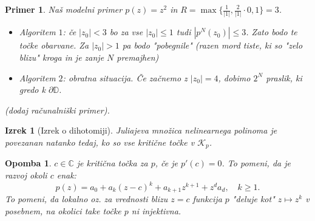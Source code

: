 \documentclass{article}
\newtheorem{opomba}{Opomba}
\newtheorem{primer}{Primer}
\newtheorem{izrek}{Izrek}
\newcommand{\C}{\mathbb{C}}
\newcommand{\D}{\mathbb{D}}
\begin{document}
\begin{primer}
Naš modelni primer $p(z) = z^2$ in $R = \max\Big\{ \frac{1}{|1|}, \frac{2}{|1|}\cdot 0, 1\Big\} = 3$. 
\begin{itemize}
    \item Algoritem $1$: če $|z_0| < 3$ bo za vse $|z_0| \leq 1$ tudi 
    $|p^N(z_0)| \leq 3$. Zato bodo te točke obarvane. Za $|z_0| > 1$ pa bodo "pobegnile"
    (razen mord tiste, ki so "zelo blizu" kroga in je zanje $N$ premajhen)
    \item Algoritem $2$: obratna situacija. Če začnemo z $|z_0| = 4$, 
    dobimo $2^N$ praslik, ki gredo k $\partial \D$.
\end{itemize}
(dodaj računalniški primer).
\end{primer}

\begin{izrek}[Izrek o dihotomiji]
Juliajeva množica nelinearnega polinoma je povezanan natanko tedaj, ko so vse 
kritične točke v $\mathcal{K}_p$.
\end{izrek}

\begin{opomba}
$c\in \C$ je kritična točka za $p$, če je $p'(c) = 0$. To pomeni, da je 
razvoj okoli $c$ enak:
$$
p(z) = a_0 + a_k(z-c)^k + a_{k+1}z^{k+1} + z^d a_d, \quad k \geq 1.
$$
To pomeni, da lokalno oz. za vrednosti blizu $z = c$ funkcija $p$ 
"deluje kot" $z \mapsto z^k$ v posebnem, na okolici take točke $p$ ni
injektivna.
\end{opomba}
\end{document}
